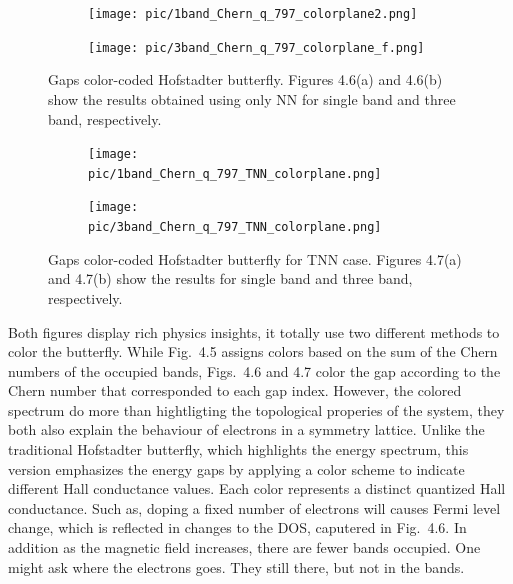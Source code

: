 \begin{figure}[htb]
	\centering
	\begin{subfigure}[b]{0.495\textwidth}
		\centering
		{\texttt{[image: pic/1band\_Chern\_q\_797\_colorplane2.png]}}
	\end{subfigure}
	\begin{subfigure}[b]{0.495\textwidth}
		\centering
		\texttt{[image: pic/3band\_Chern\_q\_797\_colorplane\_f.png]}
	\end{subfigure}
	\caption[Gaps color-coded Hofstadter butterfly for NN case.]{
		Gaps color-coded Hofstadter butterfly. Figures 4.6(a) and 4.6(b) show the results obtained using only \ac{NN} for single band and three band, respectively.
	}
\end{figure}
\begin{figure}[h]
	\centering
	\begin{subfigure}[b]{0.495\textwidth}
		\centering
		{\texttt{[image: pic/1band\_Chern\_q\_797\_TNN\_colorplane.png]}}
	\end{subfigure}
	\begin{subfigure}[b]{0.495\textwidth}
		\centering
		\texttt{[image: pic/3band\_Chern\_q\_797\_TNN\_colorplane.png]}
	\end{subfigure}
	\caption[Gaps color-coded Hofstadter butterfly for TNN case.]{
		Gaps color-coded Hofstadter butterfly for TNN case. Figures 4.7(a) and 4.7(b) show the results for single band and three band, respectively.
	}
\end{figure}

Both figures display rich physics insights, it totally use two different methods to color the butterfly. While Fig.~4.5 assigns colors based on the sum of the Chern numbers of the occupied bands, Figs.~4.6 and 4.7 color the gap according to the Chern number that corresponded to each gap index. However, the colored spectrum do more than hightligting the topological properies of the system, they both also explain the behaviour of electrons in a symmetry lattice. Unlike the traditional Hofstadter butterfly, which highlights the energy spectrum, this version emphasizes the energy gaps by applying a color scheme to indicate different Hall conductance values. Each color represents a distinct quantized Hall conductance. Such as, doping a fixed number of electrons will causes Fermi level change, which is reflected in changes to the \ac{DOS}, caputered in Fig.~4.6. In addition as the magnetic field increases, there are fewer bands occupied. One might ask where the electrons goes. They still there, but not in the bands.


